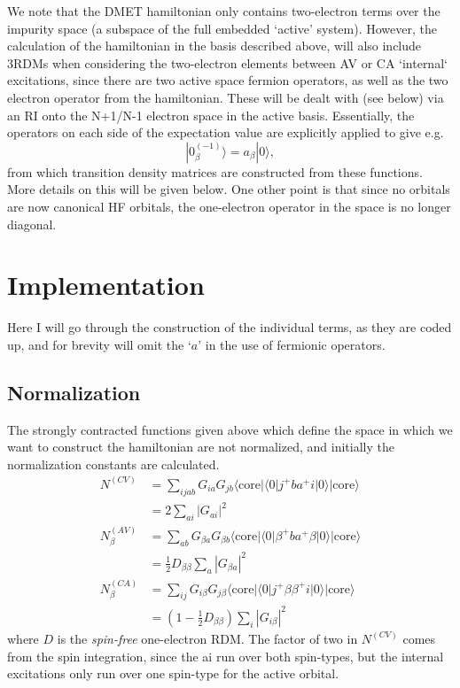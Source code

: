 \documentclass[a4paper,oneside,11pt]{article}
\numberwithin{equation}{section}
\newcommand{\DMETBra}{\langle \mathrm{core}|\langle 0|}
\newcommand{\DMETKet}{|0\rangle| \mathrm{core} \rangle}
\begin{document}
We note that the DMET hamiltonian only contains two-electron terms over the impurity space (a subspace of the full embedded `active' system). However, the calculation of the hamiltonian in the 
basis described above, will also include 3RDMs when considering the two-electron elements between AV or CA `internal` excitations, since there are two active space fermion operators, as well as the 
two electron operator from the hamiltonian. These will be dealt with (see below) via an RI onto the N+1/N-1 electron space in the active basis. Essentially, the operators on each side of the
expectation value are explicitly applied to give e.g.
\begin{equation}
|0^{(-1)}_{\beta} \rangle = a_{\beta} |0\rangle ,
\end{equation}
from which transition density matrices are constructed from these functions. More details on this will be given below. One other point is that since no orbitals are now canonical HF orbitals,
the one-electron operator in the space is no longer diagonal.

\section{Implementation}
Here I will go through the construction of the individual terms, as they are coded up, and for brevity will omit the `$a$' in the use of fermionic operators.
\subsection{Normalization}
The strongly contracted functions given above which define the space in which we want to construct the hamiltonian are not normalized, and initially the normalization constants are calculated.
\begin{align}
N^{(CV)} &= \sum_{ijab} G_{ia} G_{jb} \DMETBra j^{+} b a^{+} i \DMETKet \\
&= 2\sum_{ai} |G_{ai}|^2    \\
N^{(AV)}_{\beta} &= \sum_{ab} G_{\beta a} G_{\beta b} \DMETBra \beta^{+} b a^{+} \beta \DMETKet \\
&= \frac{1}{2} D_{\beta \beta} \sum_{a} |G_{\beta a}|^2    \label{AVNorm} \\
N^{(CA)}_{\beta} &= \sum_{ij} G_{i \beta} G_{j \beta} \DMETBra j^{+} \beta \beta^{+} i \DMETKet \\
&= \left(1-\frac{1}{2} D_{\beta \beta} \right) \sum_{i} |G_{i \beta}|^2     \label{CANorm}
\end{align}
where $D$ is the {\em spin-free} one-electron RDM. The factor of two in $N^{(CV)}$ comes from the spin integration, since the ai run over both spin-types, but the internal excitations only
run over one spin-type for the active orbital.
\end{document}
